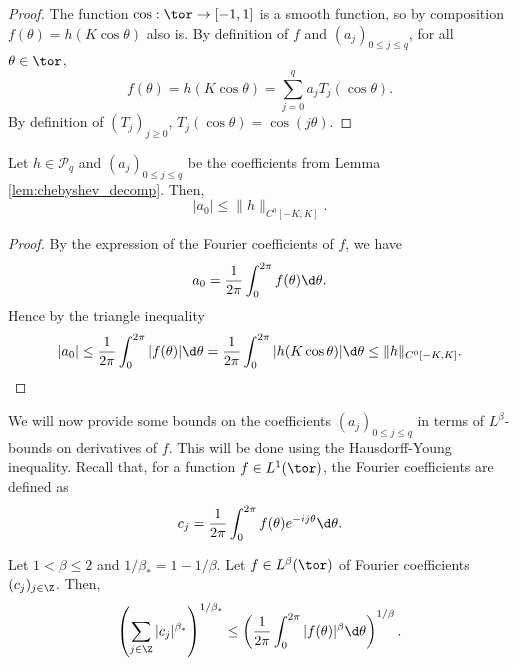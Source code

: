 \begin{proof}
  The function $\cos : \tor \rightarrow [-1,1]$ is a smooth function, so by composition
  $f(\theta) = h(K \cos \theta)$ also is.
  By definition of $f$ and $(a_j)_{0 \leq j \leq q}$,
  for all $\theta \in \tor$,
  \begin{equation*}
    f(\theta) = h(K \cos \theta) = \sum_{j=0}^q a_j T_j(\cos \theta).
  \end{equation*}
  By definition of $(T_j)_{j \geq 0}$, $T_j(\cos \theta) = \cos (j \theta)$.
\end{proof}

\begin{lemma}
  \label{lem:bound_a0}
  Let $h \in \mathcal{P}_q$ and $(a_j)_{0 \leq j \leq q}$ be the coefficients from Lemma
  \ref{lem:chebyshev_decomp}.
  Then,
  \begin{equation*}
    |a_0| \leq \| h \|_{C^0[-K,K]}.
  \end{equation*}
\end{lemma}

\begin{proof}
  By the expression of the Fourier coefficients of $f$, we have
  \begin{equation*}
    a_0 = \frac{1}{2 \pi} \int_0^{2 \pi} f(\theta) \d \theta.
  \end{equation*}
  Hence by the triangle inequality
  \begin{equation*}
    |a_0| \leq \frac{1}{2 \pi} \int_0^{2 \pi} |f(\theta)| \d \theta
    = \frac{1}{2 \pi} \int_0^{2 \pi} |h(K \cos \theta)| \d \theta
    \leq \| h \|_{C^0[-K,K]}.
  \end{equation*}
\end{proof}

We will now provide some bounds on the coefficients $(a_j)_{0 \leq j \leq q}$
in terms of $L^\beta$-bounds on derivatives of $f$.
This will be done using the Hausdorff-Young inequality.
Recall that, for a function $f \in L^1(\tor)$, the Fourier coefficients are defined as
\begin{equation*}
  c_j = \frac{1}{2 \pi} \int_0^{2 \pi} f(\theta) e^{-i j \theta} \d \theta.
\end{equation*}

\begin{theorem}
  \label{thm:hausdorff_young}
  Let $1 < \beta \leq 2$ and $1/\beta_* = 1 - 1/\beta$.
  Let $f \in L^\beta(\tor)$ of Fourier coefficients $(c_j)_{j \in \Z}$.
  Then,
  \begin{equation*}
    \left(\sum_{j \in \Z} |c_j|^{\beta_*} \right)^{1/\beta_*}
    \leq \left(\frac{1}{2 \pi} \int_0^{2 \pi} |f(\theta)|^\beta \d \theta\right)^{1/\beta}.
  \end{equation*}
\end{theorem}

